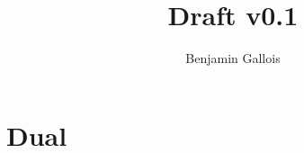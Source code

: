 \documentclass[12pt,a4paper]{report}
\title{Draft v0.1}
\author{Benjamin Gallois}
\begin{document}
\maketitle



\tableofcontents

%

\part{Dual}




\end{document}
